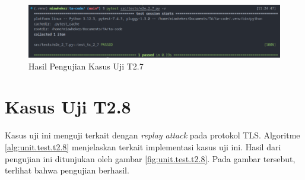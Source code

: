 \begin{figure}[ht]
  \centering
  \includegraphics[width=\textwidth]{chapters/res/appendix-4/2.7.png}
  \caption{Hasil Pengujian Kasus Uji T2.7}
  \label{fig:unit.test.t2.7}
\end{figure}

\section{Kasus Uji T2.8}

Kasus uji ini menguji terkait dengan \emph{replay attack} pada protokol TLS. Algoritme \ref{alg:unit.test.t2.8} menjelaskan terkait implementasi kasus uji ini. Hasil dari pengujian ini ditunjukan oleh gambar \ref{fig:unit.test.t2.8}. Pada gambar tersebut, terlihat bahwa pengujian berhasil.



